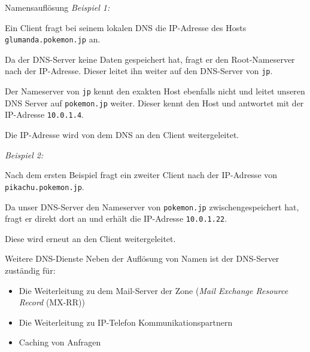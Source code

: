 \begin{example}{Namensauflösung}
    \emph{Beispiel 1:}

    Ein Client fragt bei seinem lokalen DNS die IP-Adresse des Hosts \texttt{glumanda.pokemon.jp} an.

    Da der DNS-Server keine Daten gespeichert hat, fragt er den Root-Nameserver nach der IP-Adresse.
    Dieser leitet ihn weiter auf den DNS-Server von \texttt{jp}.

    Der Nameserver von \texttt{jp} kennt den exakten Host ebenfalls nicht und leitet unseren DNS Server auf \texttt{pokemon.jp} weiter.
    Dieser kennt den Host und antwortet mit der IP-Adresse \texttt{10.0.1.4}.

    Die IP-Adresse wird von dem DNS an den Client weitergeleitet.

    \emph{Beispiel 2:}

    Nach dem ersten Beispiel fragt ein zweiter Client nach der IP-Adresse von \texttt{pikachu.pokemon.jp}.

    Da unser DNS-Server den Nameserver von \texttt{pokemon.jp} zwischengespeichert hat, fragt er direkt dort an und erhält die IP-Adresse \texttt{10.0.1.22}.

    Diese wird erneut an den Client weitergeleitet.
\end{example}

\begin{bonus}{Weitere DNS-Dienste}
    Neben der Auflösung von Namen ist der DNS-Server zuständig für:
    \begin{itemize}
        \item Die Weiterleitung zu dem Mail-Server der Zone (\emph{Mail Exchange Resource Record} (MX-RR))
        \item Die Weiterleitung zu IP-Telefon Kommunikationspartnern
        \item Caching von Anfragen
    \end{itemize}
\end{bonus}

